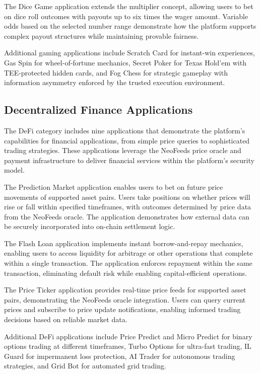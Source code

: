 \documentclass[11pt,a4paper]{article}
\begin{document}
The Dice Game application extends the multiplier concept, allowing users to bet on dice roll outcomes with payouts up to six times the wager amount. Variable odds based on the selected number range demonstrate how the platform supports complex payout structures while maintaining provable fairness.

Additional gaming applications include Scratch Card for instant-win experiences, Gas Spin for wheel-of-fortune mechanics, Secret Poker for Texas Hold'em with TEE-protected hidden cards, and Fog Chess for strategic gameplay with information asymmetry enforced by the trusted execution environment.

\subsection{Decentralized Finance Applications}

The DeFi category includes nine applications that demonstrate the platform's capabilities for financial applications, from simple price queries to sophisticated trading strategies. These applications leverage the NeoFeeds price oracle and payment infrastructure to deliver financial services within the platform's security model.

The Prediction Market application enables users to bet on future price movements of supported asset pairs. Users take positions on whether prices will rise or fall within specified timeframes, with outcomes determined by price data from the NeoFeeds oracle. The application demonstrates how external data can be securely incorporated into on-chain settlement logic.

The Flash Loan application implements instant borrow-and-repay mechanics, enabling users to access liquidity for arbitrage or other operations that complete within a single transaction. The application enforces repayment within the same transaction, eliminating default risk while enabling capital-efficient operations.

The Price Ticker application provides real-time price feeds for supported asset pairs, demonstrating the NeoFeeds oracle integration. Users can query current prices and subscribe to price update notifications, enabling informed trading decisions based on reliable market data.

Additional DeFi applications include Price Predict and Micro Predict for binary options trading at different timeframes, Turbo Options for ultra-fast trading, IL Guard for impermanent loss protection, AI Trader for autonomous trading strategies, and Grid Bot for automated grid trading.
\end{document}
